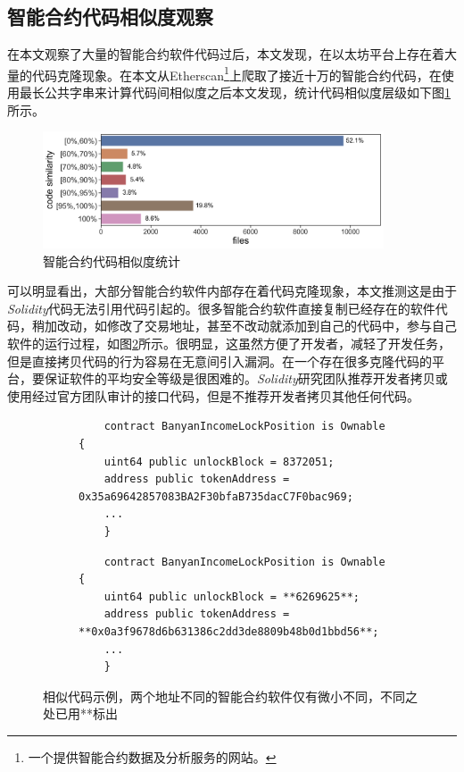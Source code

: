 \subsection{智能合约代码相似度观察}
在本文观察了大量的智能合约软件代码过后，本文发现，在以太坊平台上存在着大量的代码克隆现象。在本文从Etherscan\footnote{一个提供智能合约数据及分析服务的网站。}上爬取了接近十万的智能合约代码，在使用最长公共字串来计算代码间相似度之后本文发现，统计代码相似度层级如下图\ref{fig:similarity}所示。
\begin{figure}[htbp]
\vspace{+2mm}
  \centering
  \includegraphics[width=0.9\textwidth]{figures/similarity.png}
  \caption{智能合约代码相似度统计}
  \label{fig:similarity}
\vspace{-5mm}
\end{figure}
可以明显看出，大部分智能合约软件内部存在着代码克隆现象，本文推测这是由于\emph{Solidity}代码无法引用代码引起的。很多智能合约软件直接复制已经存在的软件代码，稍加改动，如修改了交易地址，甚至不改动就添加到自己的代码中，参与自己软件的运行过程，如图\ref{fig:similar_code}所示。很明显，这虽然方便了开发者，减轻了开发任务，但是直接拷贝代码的行为容易在无意间引入漏洞。在一个存在很多克隆代码的平台，要保证软件的平均安全等级是很困难的。\emph{Solidity}研究团队推荐开发者拷贝或使用经过官方团队审计的接口代码，但是不推荐开发者拷贝其他任何代码。
\begin{figure}[H]
    \centering
    \begin{subfigure}{\linewidth}
    \centering
    \begin{minipage}{1.0\linewidth}
    \begin{lstlisting}
    contract BanyanIncomeLockPosition is Ownable {
    uint64 public unlockBlock = 8372051;
    address public tokenAddress = 0x35a69642857083BA2F30bfaB735dacC7F0bac969;
    ...
    }
    \end{lstlisting}
    \end{minipage}
    \end{subfigure}
    \quad
    \begin{subfigure}{\linewidth}
    \centering
    \begin{minipage}{1.0\linewidth}
    \begin{lstlisting}
    contract BanyanIncomeLockPosition is Ownable {
    uint64 public unlockBlock = **6269625**;
    address public tokenAddress = **0x0a3f9678d6b631386c2dd3de8809b48b0d1bbd56**;
    ...
    }
    \end{lstlisting}
    \end{minipage}
    \end{subfigure}
    \caption{相似代码示例，两个地址不同的智能合约软件仅有微小不同，不同之处已用**标出}
    \label{fig:similar_code}
\end{figure}

